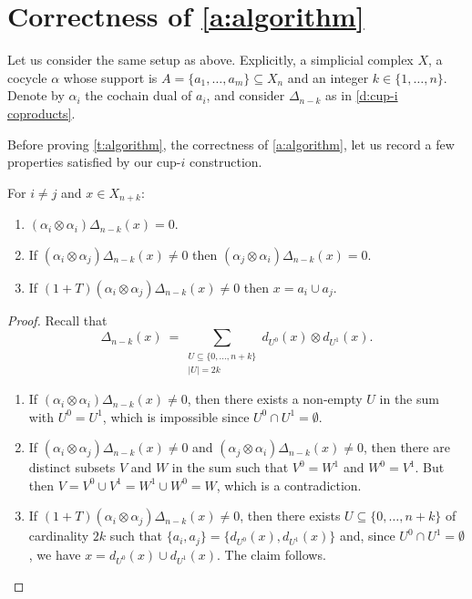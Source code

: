 
\section{Correctness of \cref{a:algorithm}} \label{s:correctness}

Let us consider the same setup as above. Explicitly, a simplicial complex $X$, a cocycle $\alpha$ whose support is $A = \{a_1, \dots, a_m\} \subseteq X_n$ and an integer $k \in \{1, \dots, n\}$.
Denote by $\alpha_i$ the cochain dual of $a_i$, and consider
$\Delta_{n-k}$ as in \cref{d:cup-i coproducts}.

Before proving \cref{t:algorithm}, the correctness of \cref{a:algorithm}, let us record a few properties satisfied by our cup-$i$ construction.

\begin{lemma} \label{l:freeness}
	For $i \neq j$ and $x \in X_{n+k}$:
	\begin{enumerate}
		\item $(\alpha_i \otimes \alpha_i)\Delta_{n-k}(x) = 0$.
		\item If $(\alpha_i \otimes \alpha_j)\Delta_{n-k}(x) \neq 0$ then $(\alpha_j \otimes \alpha_i)\Delta_{n-k}(x) = 0$.
		\item If $(1+T)(\alpha_i \otimes \alpha_j)\Delta_{n-k}(x) \neq 0$ then $x = a_i \cup a_j$.
	\end{enumerate}
\end{lemma}

\begin{proof}
	Recall that
	\begin{equation*}
	\Delta_{n-k}(x) \ = \! \sum_{\substack{U \subseteq \{0, \dots, n+k\} \\ \vert U \vert = 2k}}
	d_{U^0}(x) \otimes d_{U^1}(x).
	\end{equation*}

	\begin{enumerate}
		\item If $(\alpha_i \otimes \alpha_i)\Delta_{n-k}(x) \neq 0$, then there exists a non-empty $U$ in the sum with $U^0 = U^1$, which is impossible since $U^0 \cap U^1 = \emptyset$.

		\item If $(\alpha_i \otimes \alpha_j)\Delta_{n-k}(x) \neq 0$ and $(\alpha_j \otimes \alpha_i)\Delta_{n-k}(x) \neq 0$, then there are distinct subsets $V$ and $W$ in the sum such that $V^0 = W^1$ and $W^0 = V^1$.
		But then $V = V^0 \cup V^1 = W^1 \cup W^0 = W$, which is a contradiction.

		\item If $(1+T)(\alpha_i \otimes \alpha_j)\Delta_{n-k}(x) \neq 0$, then there exists $U \subseteq \{0, \dots, n+k\}$ of cardinality $2k$ such that $\{a_i, a_j\} = \{d_{U^0}(x), d_{U^1}(x)\}$ and, since $U^0 \cap U^1 = \emptyset$, we have $x = d_{U^0}(x) \cup d_{U^1}(x)$.
		The claim follows.
	\end{enumerate}
\end{proof}

